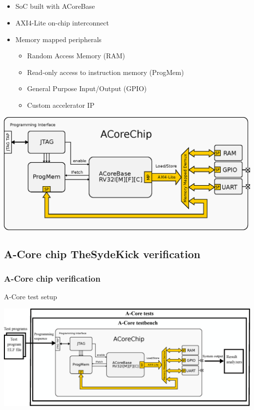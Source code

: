 \documentclass{sdkslides}
\begin{document}
\subsection*{\sectionname}
\begin{frame}[c]
    \frametitle{\sectionname}
    \begin{itemize}
        \item SoC built with ACoreBase
        \item AXI4-Lite on-chip interconnect
        \item Memory mapped peripherals
            \begin{itemize}
                \item Random Access Memory (RAM)
                \item Read-only access to instruction memory (ProgMem)
                \item General Purpose Input/Output (GPIO)
                \item Custom accelerator IP
            \end{itemize}
    \end{itemize}
        \includegraphics[width=.8\textwidth]{./Pics/acorechip.eps}
\end{frame}

\renewcommand{\sectionname}{A-Core chip TheSydeKick verification}
\subsection*{\sectionname}
\begin{frame}[c]
    \frametitle{A-Core chip verification }
    \begin{block}{A-Core test setup}
        \begin{center}
            \includegraphics[width=\textwidth]{./Pics/A-Core_testsetup.eps}
        \end{center}
    \end{block}
\end{frame}
\end{document}
